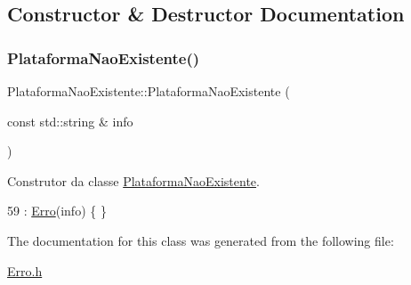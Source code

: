 \subsection{Constructor \& Destructor Documentation}
\mbox{\label{classPlataformaNaoExistente_ada0f9e32fe5f64550905ce8e35e8ab34}} 
\subsubsection{\texorpdfstring{Plataforma\+Nao\+Existente()}{PlataformaNaoExistente()}}
{\footnotesize\ttfamily Plataforma\+Nao\+Existente\+::\+Plataforma\+Nao\+Existente (\begin{DoxyParamCaption}\item[{const std\+::string \&}]{info }\end{DoxyParamCaption})\hspace{0.3cm}{\ttfamily [inline]}}



Construtor da classe \hyperlink{classPlataformaNaoExistente}{Plataforma\+Nao\+Existente}. 


\begin{DoxyCode}
59 : \hyperlink{classErro_a15d79796bd17517ff05d45eee55556f1}{Erro}(info) \{ \}
\end{DoxyCode}


The documentation for this class was generated from the following file\+:\begin{DoxyCompactItemize}
\item 
\hyperlink{Erro_8h}{Erro.\+h}\end{DoxyCompactItemize}

